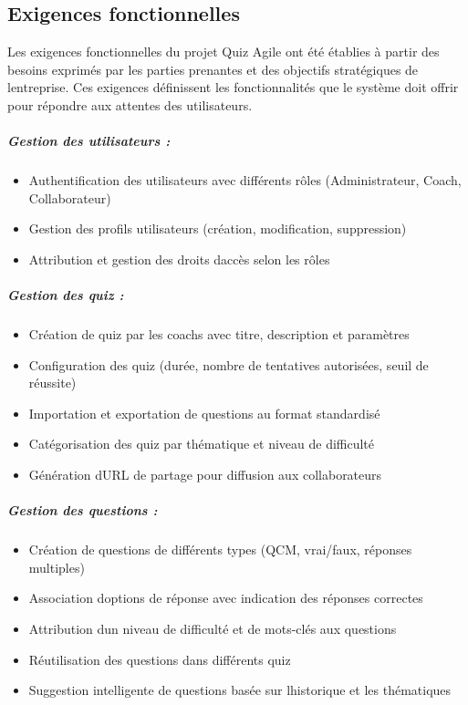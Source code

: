 \documentclass[12pt,a4paper,twoside]{report}
\begin{document}
\hypertarget{exigences-fonctionnelles}{%
\subsection{Exigences fonctionnelles}\label{exigences-fonctionnelles}}

Les exigences fonctionnelles du projet Quiz Agile ont été établies à
partir des besoins exprimés par les parties prenantes et des objectifs
stratégiques de l\textquotesingle entreprise. Ces exigences définissent
les fonctionnalités que le système doit offrir pour répondre aux
attentes des utilisateurs.

\hypertarget{gestion-des-utilisateurs}{%
\subparagraph{Gestion des utilisateurs
:}\label{gestion-des-utilisateurs}}

\begin{itemize}
\item
  Authentification des utilisateurs avec différents rôles
  (Administrateur, Coach, Collaborateur)
\item
  Gestion des profils utilisateurs (création, modification, suppression)
\item
  Attribution et gestion des droits d\textquotesingle accès selon les
  rôles
\end{itemize}

\hypertarget{gestion-des-quiz}{%
\subparagraph{Gestion des quiz :}\label{gestion-des-quiz}}

\begin{itemize}
\item
  Création de quiz par les coachs avec titre, description et paramètres
\item
  Configuration des quiz (durée, nombre de tentatives autorisées, seuil
  de réussite)
\item
  Importation et exportation de questions au format standardisé
\item
  Catégorisation des quiz par thématique et niveau de difficulté
\item
  Génération d\textquotesingle URL de partage pour diffusion aux
  collaborateurs
\end{itemize}

\hypertarget{gestion-des-questions}{%
\subparagraph{Gestion des questions :}\label{gestion-des-questions}}

\begin{itemize}
\item
  Création de questions de différents types (QCM, vrai/faux, réponses
  multiples)
\item
  Association d\textquotesingle options de réponse avec indication des
  réponses correctes
\item
  Attribution d\textquotesingle un niveau de difficulté et de mots-clés
  aux questions
\item
  Réutilisation des questions dans différents quiz
\item
  Suggestion intelligente de questions basée sur
  l\textquotesingle historique et les thématiques
\end{itemize}
\end{document}
